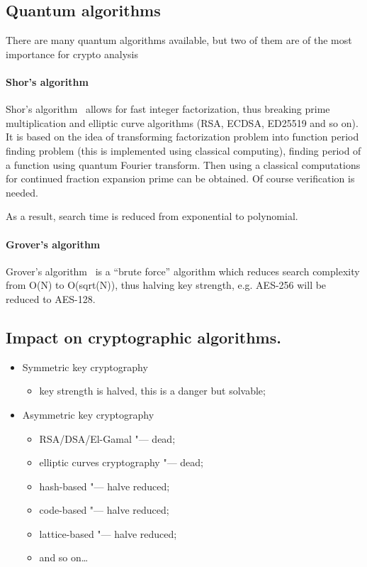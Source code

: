 \documentclass[10pt, a5paper]{article}
\begin{document}
\subsection*{Quantum algorithms}

There are many quantum algorithms available, but two of them are of the most importance for crypto analysis

\paragraph{Shor's algorithm}

Shor's algorithm~\cite{Savchenko2} allows for fast integer \linebreak factorization, thus breaking prime multiplication and elliptic curve \linebreak algorithms (RSA, ECDSA, ED25519 and so on). It is based on the idea of transforming factorization problem into function period finding problem (this is implemented using classical computing), finding period of a function using quantum Fourier transform. Then using a classical computations for continued fraction expansion prime can be obtained. Of course verification is needed.

As a result, search time is reduced from exponential to polynomial.

\paragraph{Grover's algorithm}

Grover's algorithm~\cite{Savchenko3} is a ``brute force'' algorithm which reduces search complexity from O(N) to O(sqrt(N)), thus halving key strength, e.g. AES-256 will be reduced to AES-128.

\subsection*{Impact on cryptographic algorithms.}

\begin{itemize}
  \item Symmetric key cryptography\begin{itemize}
  \item key strength is halved, this is a danger but solvable;
\end{itemize}


  \item Asymmetric key cryptography\begin{itemize}
  \item RSA/DSA/El-Gamal "--- dead;
  \item elliptic curves cryptography "--- dead;
  \item hash-based "--- halve reduced;
  \item code-based "--- halve reduced;
  \item lattice-based "--- halve reduced;
  \item and so on\ldots{}
\end{itemize}


\end{itemize}
\end{document}

